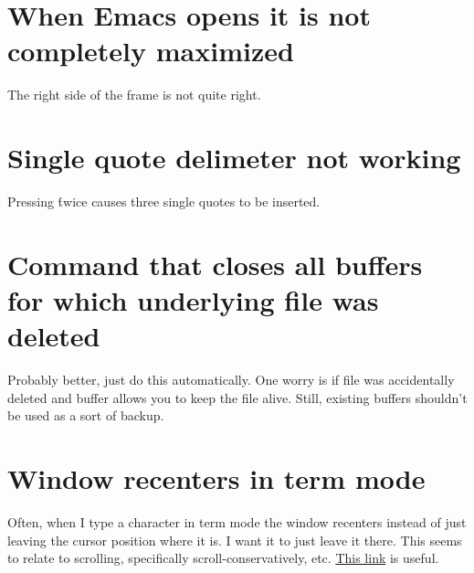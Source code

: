 \documentclass{default}
\begin{document}
\section{When Emacs opens it is not completely maximized}

The right side of the frame is not quite right.

\section{Single quote delimeter not working}

Pressing \' twice causes three single quotes to be inserted.

\section{Command that closes all buffers for which underlying file was deleted}

Probably better, just do this automatically. One worry is if file was accidentally deleted and
buffer allows you to keep the file alive. Still, existing buffers shouldn't be used as a sort of
backup.

\section{Window recenters in term mode}

Often, when I type a character in term mode the window recenters instead of just leaving the cursor
position where it is. I want it to just leave it there. This seems to relate to scrolling,
specifically scroll-conservatively,
etc. \href{https://www.gnu.org/software/emacs/manual/html_node/emacs/Auto-Scrolling.html}{This link}
is useful.
\end{document}
